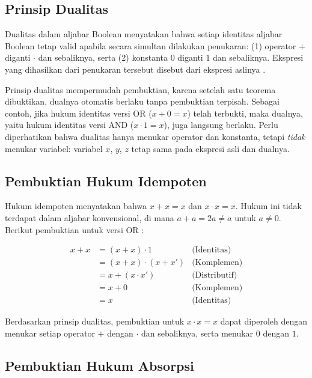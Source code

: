 \subsection{Prinsip Dualitas}

\begin{definisi}
Dualitas dalam aljabar Boolean menyatakan bahwa setiap identitas aljabar Boolean tetap valid apabila secara simultan dilakukan penukaran: (1) operator $+$ diganti $\cdot$ dan sebaliknya, serta (2) konstanta $0$ diganti $1$ dan sebaliknya. Ekspresi yang dihasilkan dari penukaran tersebut disebut  dari ekspresi aslinya \cite{rosen2019}.
\end{definisi}

Prinsip dualitas mempermudah pembuktian, karena setelah satu teorema dibuktikan, dualnya otomatis berlaku tanpa pembuktian terpisah. Sebagai contoh, jika hukum identitas versi OR ($x + 0 = x$) telah terbukti, maka dualnya, yaitu hukum identitas versi AND ($x \cdot 1 = x$), juga langsung berlaku. Perlu diperhatikan bahwa dualitas hanya menukar operator dan konstanta, tetapi \emph{tidak} menukar variabel: variabel $x$, $y$, $z$ tetap sama pada ekspresi asli dan dualnya.

\subsection{Pembuktian Hukum Idempoten}

Hukum idempoten menyatakan bahwa $x + x = x$ dan $x \cdot x = x$. Hukum ini tidak terdapat dalam aljabar konvensional, di mana $a + a = 2a \neq a$ untuk $a \neq 0$. Berikut pembuktian untuk versi OR \cite{rosen2019}:

\begin{align*}
x + x &= (x + x) \cdot 1 & \text{(Identitas)} \\
      &= (x + x) \cdot (x + x') & \text{(Komplemen)} \\
      &= x + (x \cdot x') & \text{(Distributif)} \\
      &= x + 0 & \text{(Komplemen)} \\
      &= x & \text{(Identitas)}
\end{align*}

Berdasarkan prinsip dualitas, pembuktian untuk $x \cdot x = x$ dapat diperoleh dengan menukar setiap operator $+$ dengan $\cdot$ dan sebaliknya, serta menukar $0$ dengan $1$.

\subsection{Pembuktian Hukum Absorpsi}

